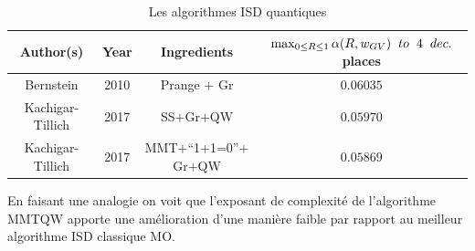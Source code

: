 \documentclass[12pt,openany]{report}
\begin{document}
\begin{table}
\centering
\begin{tabular}{ |c|c|c|c| } 
\hline
Author(s)& Year& Ingredients &$\max_{0\leq R \leq 1}\alpha(R,w_{GV}) \hspace{0.2cm} to\hspace{0.2cm} 4 \hspace{0.2cm} dec.$ places \\
\hline
Bernstein\cite{Berst5}& 2010&Prange $+$ Gr\footnotemark{}  & $0.06035$\\
\hline
 Kachigar- Tillich  & 2017& SS\footnotemark{}$+$Gr$+$QW\footnotemark{} &$ 0.05970 $\\
\hline
 Kachigar- Tillich & 2017&MMT$+$“1+1=0”$+$Gr$+$QW& $0.05869$\\
\hline

\end{tabular}
\caption{Les algorithmes ISD quantiques}
\label{isd_quantique}
\end{table}


En faisant une analogie  on voit que l'exposant de complexité de l'algorithme MMTQW apporte une amélioration d'une manière faible par rapport au meilleur algorithme ISD classique MO.
\end{document}
